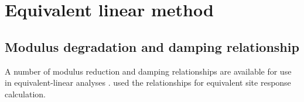 \newpage
\section{Equivalent linear method}
\subsection{Modulus degradation and damping relationship}

A number of modulus reduction and damping relationships are available for use in equivalent-linear analyses . \citet{Kaklamanos2013} used the \citet{Zhang2005} relationships for equivalent site response calculation. 